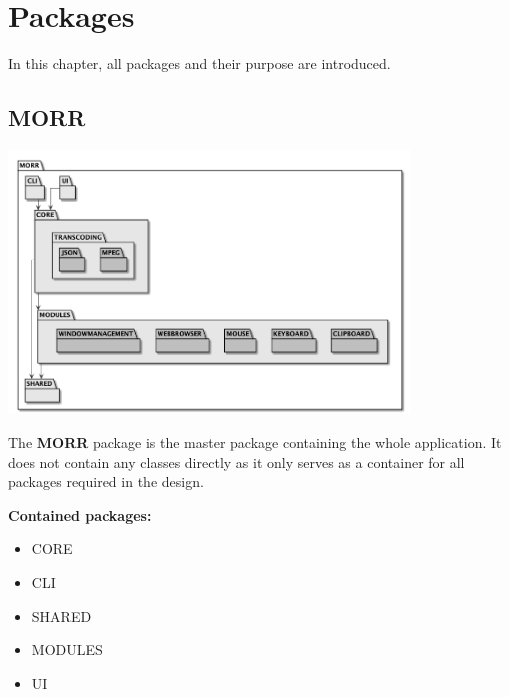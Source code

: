 \chapter{Packages}
\label{ch:package}
\newenvironment{packclass}[0]{\textbf{Contained classes:} \begin{itemize}
}{\end{itemize}}
\newenvironment{packenum}[0]{\textbf{Contained enums:} \begin{itemize}
}{\end{itemize}}
\newenvironment{packif}[0]{\textbf{Contained interfaces:} \begin{itemize}
}{\end{itemize}}
\newenvironment{packpack}[0]{\textbf{Contained packages:} \begin{itemize}
}{\end{itemize}}
\newcommand{\packobj}[1]{\item #1}
\newcommand{\abstract}[1]{\textit{abstract} #1}

In this chapter, all packages and their purpose are introduced.

\section{MORR}

\begin{center}
    \includegraphics[width=0.80\textwidth]{resources/Packages/AllPackages.png}
\end{center}

The \textbf{MORR} package is the master package containing the whole application. It does not contain any classes directly as it only serves as a container for all packages required in the design.

\begin{packpack}
\packobj{CORE}
\packobj{CLI}
\packobj{SHARED}
\packobj{MODULES}
\packobj{UI}
\end{packpack}

